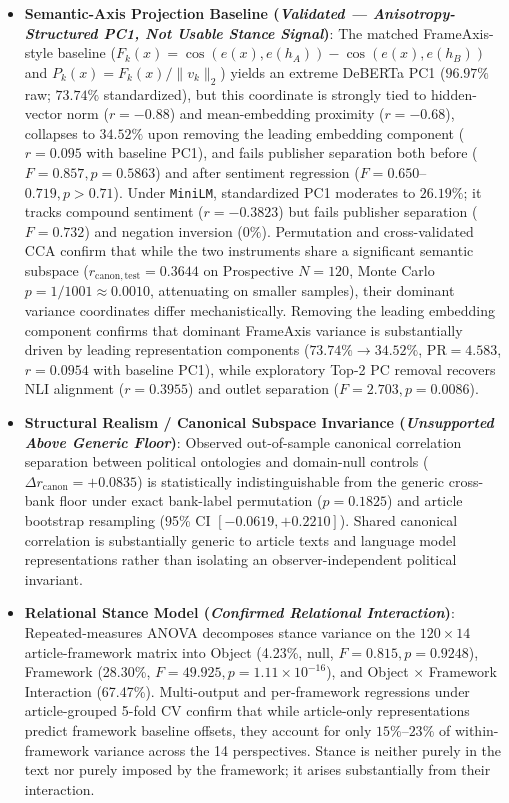 \begin{itemize}
    \item \textbf{Semantic-Axis Projection Baseline (\emph{Validated --- Anisotropy-Structured PC1, Not Usable Stance Signal})}: The matched FrameAxis-style baseline ($F_k(x) = \cos(e(x), e(h_A)) - \cos(e(x), e(h_B))$ and $P_k(x) = F_k(x)/\|v_k\|_2$) yields an extreme DeBERTa PC1 ($96.97\%$ raw; $73.74\%$ standardized), but this coordinate is strongly tied to hidden-vector norm ($r = -0.88$) and mean-embedding proximity ($r = -0.68$), collapses to $34.52\%$ upon removing the leading embedding component ($r = 0.095$ with baseline PC1), and fails publisher separation both before ($F = 0.857, p = 0.5863$) and after sentiment regression ($F = 0.650$--$0.719, p > 0.71$). Under \texttt{MiniLM}, standardized PC1 moderates to $26.19\%$; it tracks compound sentiment ($r=-0.3823$) but fails publisher separation ($F=0.732$) and negation inversion ($0\%$). Permutation and cross-validated CCA confirm that while the two instruments share a significant semantic subspace ($r_{\mathrm{canon,test}} = 0.3644$ on Prospective $N=120$, Monte Carlo $p = 1/1001 \approx 0.0010$, attenuating on smaller samples), their dominant variance coordinates differ mechanistically. Removing the leading embedding component confirms that dominant FrameAxis variance is substantially driven by leading representation components ($73.74\% \to 34.52\%$, $\mathrm{PR} = 4.583$, $r = 0.0954$ with baseline PC1), while exploratory Top-2 PC removal recovers NLI alignment ($r = 0.3955$) and outlet separation ($F = 2.703, p = 0.0086$).
    \item \textbf{Structural Realism / Canonical Subspace Invariance (\emph{Unsupported Above Generic Floor})}: Observed out-of-sample canonical correlation separation between political ontologies and domain-null controls ($\Delta r_{\mathrm{canon}} = +0.0835$) is statistically indistinguishable from the generic cross-bank floor under exact bank-label permutation ($p = 0.1825$) and article bootstrap resampling (95\% CI $[-0.0619, +0.2210]$). Shared canonical correlation is substantially generic to article texts and language model representations rather than isolating an observer-independent political invariant.
    \item \textbf{Relational Stance Model (\emph{Confirmed Relational Interaction})}: Repeated-measures ANOVA decomposes stance variance on the $120 \times 14$ article-framework matrix into Object (4.23\%, null, $F = 0.815, p = 0.9248$), Framework (28.30\%, $F = 49.925, p = 1.11 \times 10^{-16}$), and Object $\times$ Framework Interaction (67.47\%). Multi-output and per-framework regressions under article-grouped 5-fold CV confirm that while article-only representations predict framework baseline offsets, they account for only $15\%$--$23\%$ of within-framework variance across the 14 perspectives. Stance is neither purely in the text nor purely imposed by the framework; it arises substantially from their interaction.

\end{itemize}
